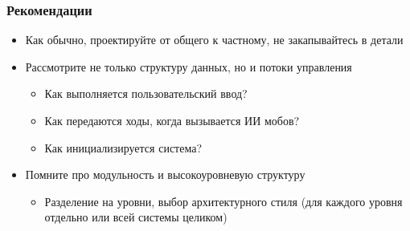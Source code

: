 \documentclass[xetex,mathserif,serif]{beamer}
\begin{document}
	\begin{frame}
		\frametitle{Рекомендации}
		\begin{itemize}
			\item Как обычно, проектируйте от общего к частному, не закапывайтесь в детали
			\item Рассмотрите не только структуру данных, но и потоки управления
			\begin{itemize}
				\item Как выполняется пользовательский ввод?
				\item Как передаются ходы, когда вызывается ИИ мобов?
				\item Как инициализируется система?
			\end{itemize}
			\item Помните про модульность и высокоуровневую структуру
			\begin{itemize}
				\item Разделение на уровни, выбор архитектурного стиля (для каждого уровня отдельно или всей системы целиком)
			\end{itemize}
		\end{itemize}
	\end{frame}
\end{document}
